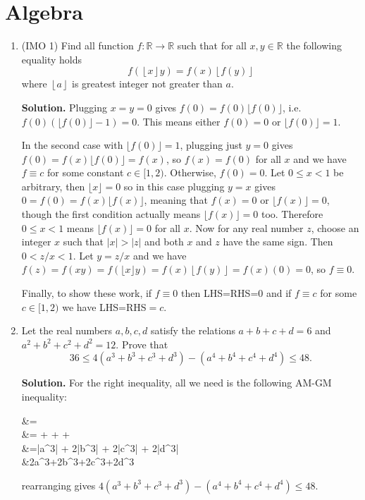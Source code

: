 \documentclass[11pt]{article}
\newcommand{\<}{\langle}
\renewcommand{\>}{\rangle}
\begin{document}
\section*{Algebra}
\begin{enumerate}
	\item [\textbf{A1}] (IMO 1) Find all function $f:\mathbb{R}\rightarrow\mathbb{R}$ such that for all $x,y\in\mathbb{R}$ the following equality holds \[
	f(\left\lfloor x\right\rfloor y)=f(x)\left\lfloor f(y)\right\rfloor \] where $\left\lfloor a\right\rfloor $ is greatest integer not greater than $a.$
	
	\textbf{Solution.} Plugging $x=y=0$ gives $f(0)=f(0)\lfloor f(0)\rfloor$, i.e. $f(0)(\lfloor f(0)\rfloor-1)=0$. 
	This means either $f(0)=0$ or $\lfloor f(0)\rfloor=1$. 
	
	In the second case with $\lfloor f(0)\rfloor=1$, plugging just $y=0$ gives $f(0)=f(x)\lfloor f(0)\rfloor=f(x)$, so $f(x)=f(0)$ for all $x$ and we have $f\equiv c$ for some constant $c\in [1, 2)$. Otherwise, $f(0)=0$. 
	Let $0\le x<1$ be arbitrary, then $\lfloor x\rfloor =0$ so in this case plugging $y=x$ gives $0=f(0)=f(x)\lfloor f(x)\rfloor $, meaning that 
	$f(x)=0$ or $\lfloor f(x)\rfloor =0$, though the first condition actually means $\lfloor f(x)\rfloor =0$ too. 
	Therefore $0\le x<1$ means $\lfloor f(x)\rfloor =0$ for all $x$. 
	Now for any real number $z$, choose an integer $x$ such that $|x|>|z|$ and both $x$ and $z$ have the same sign. Then $0<z/x<1$. Let $y=z/x$ and we have 
	$f(z)=f(xy)=f(\lfloor x\rfloor y)=f(x)\left\lfloor f(y)\right\rfloor =f(x)(0)=0$, so $f\equiv 0$. 
	
	Finally, to show these work, if $f\equiv 0$ then LHS=RHS=0 and if $f\equiv c$ for some $c\in [1, 2)$ we have LHS=RHS$=c$. 
	
	\item[\textbf{A2}] Let the real numbers $a,b,c,d$ satisfy the relations $a+b+c+d=6$ and $a^2+b^2+c^2+d^2=12.$ Prove that
	\[36 \leq 4 \left(a^3+b^3+c^3+d^3\right) - \left(a^4+b^4+c^4+d^4 \right) \leq 48.\]
	
	\textbf{Solution.} For the right inequality, all we need is the following AM-GM inequality: 
	\begin{flalign*}
	&=\\
	&=\ge {} +  + +\\
	&=|a^3| + 2|b^3| + 2|c^3| + 2|d^3|\\
	&\ge 2a^3+2b^3+2c^3+2d^3
	\end{flalign*}
	rearranging gives $4 \left(a^3+b^3+c^3+d^3\right) - \left(a^4+b^4+c^4+d^4 \right) \leq 48$. 
	

\end{enumerate}
\end{document}
